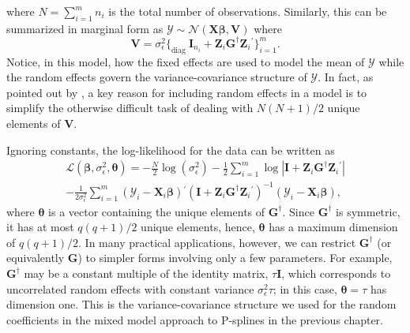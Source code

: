 \documentclass[cmfont,usenames,dvipsnames,leqno]{afit-etd}\usepackage[]{graphicx}\usepackage[]{color}
\newcommand{\loglik}{\mathscr{L}}
\newcommand{\trans}{\ensuremath{^\prime}}
\newcommand{\bc}[1]{\ensuremath{\bm{\mathcal{#1}}}}
\newcommand{\mc}[1]{\ensuremath{\mathcal{#1}}}
\newcommand{\X}{\ensuremath{\bm{X}}}
\newcommand{\Z}{\ensuremath{\bm{Z}}}
\begin{document}
  where $N = \sum_{i=1}^m n_i$ is the total number of observations. Similarly, this can be summarized in marginal form as $\bc{Y} \sim \mc{N}\left(\X\bm{\beta}, \bm{V}\right)$ where 
\begin{equation*}
  \bm{V} = \sigma_\epsilon^2\Big\lbrace_{\text{diag }} \bm{I}_{n_i} + \Z_i\bm{G}^\dagger\Z_i\trans \Big\rbrace_{i = 1}^m. 
\end{equation*}  
Notice, in this model, how the fixed effects are used to model the mean of $\bc{Y}$ while the random effects govern the variance-covariance structure of $\bc{Y}$. In fact, as pointed out by \citet{mcculloch_generalized_2008}, a key reason for including random effects in a model is to simplify the otherwise difficult task of dealing with $N(N+1)/2$ unique elements of $\bm{V}$. 

Ignoring constants, the log-likelihood for the data can be written as
\begin{multline}
\label{eqn:lmm-loglik}
  \loglik\left(\bm{\beta}, \sigma_\epsilon^2, \bm{\theta}\right) = -\frac{N}{2}\log(\sigma_\epsilon^2) - \frac{1}{2}\sum_{i = 1}^m\log\left|\bm{I} + \Z_i\bm{G}^\dagger\Z_i\trans\right| \\ - \frac{1}{2\sigma_\epsilon^2}\sum_{i = 1}^m \left(\bc{Y}_i - \X_i\bm{\beta}\right)\trans\left(\bm{I} + \Z_i\bm{G}^\dagger\Z_i\trans\right)^{-1}\left(\bc{Y}_i - \X_i\bm{\beta}\right),
\end{multline}
where $\bm{\theta}$ is a vector containing the unique elements of $\bm{G}^\dagger$. Since $\bm{G}^\dagger$ is symmetric, it has at most $q(q+1)/2$ unique elements, hence, $\bm{\theta}$ has a maximum dimension of $q(q+1)/2$. In many practical applications, however, we can restrict $\bm{G}^\dagger$ (or equivalently $\bm{G}$) to simpler forms involving only a few parameters. For example, $\bm{G}^\dagger$ may be a constant multiple of the identity matrix, $\tau\bm{I}$, which corresponds to uncorrelated random effects with constant variance $\sigma_\epsilon^2\tau$; in this case, $\bm{\theta} = \tau$ has dimension one. This is the variance-covariance structure we used for the random coefficients in the mixed model approach to P-splines in the previous chapter.
\end{document}
